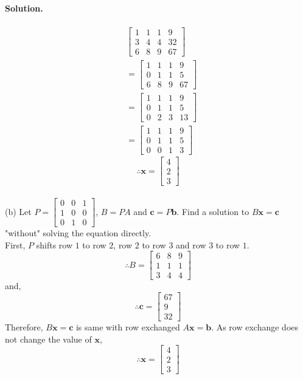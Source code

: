 \paragraph*{Solution.}
\begin{align*}
    &\left[\begin{array}{ccc|c}
        1&1&1&9\\
        3&4&4&32\\
        6&8&9&67
    \end{array}\right]\\
    &=\left[\begin{array}{ccc|c}
        1&1&1&9\\
        0&1&1&5\\
        6&8&9&67
    \end{array}\right]\\
    &=\left[\begin{array}{ccc|c}
        1&1&1&9\\
        0&1&1&5\\
        0&2&3&13
    \end{array}\right]\\
    &=\left[\begin{array}{ccc|c}
        1&1&1&9\\
        0&1&1&5\\
        0&0&1&3
    \end{array}\right]
\end{align*}
$$\therefore\mathbf{x}=\begin{bmatrix}
    4\\2\\3
\end{bmatrix}$$\\

(b) Let $P=\begin{bmatrix}
    0&0&1\\1&0&0\\0&1&0
\end{bmatrix}$, $B=PA$ and $\mathbf{c}=P\mathbf{b}$. Find a solution to $B\mathbf{x}=\mathbf{c}$ "without" solving the equation directly.\\
First, $P$ shifts row $1$ to row $2$, row $2$ to row $3$ and row $3$ to row $1$.
$$\therefore B = \begin{bmatrix}
    6&8&9\\
    1&1&1\\
    3&4&4
\end{bmatrix}$$
and,
$$\therefore \mathbf{c} = \begin{bmatrix}
    67\\9\\32
\end{bmatrix}$$
Therefore, $B\mathbf{x}=\mathbf{c}$ is same with row exchanged $A\mathbf{x} = \mathbf{b}$.
As row exchange does not change the value of $\mathbf{x}$,
$$\therefore \mathbf{x} = \begin{bmatrix}
    4\\2\\3
\end{bmatrix}$$
\newpage
